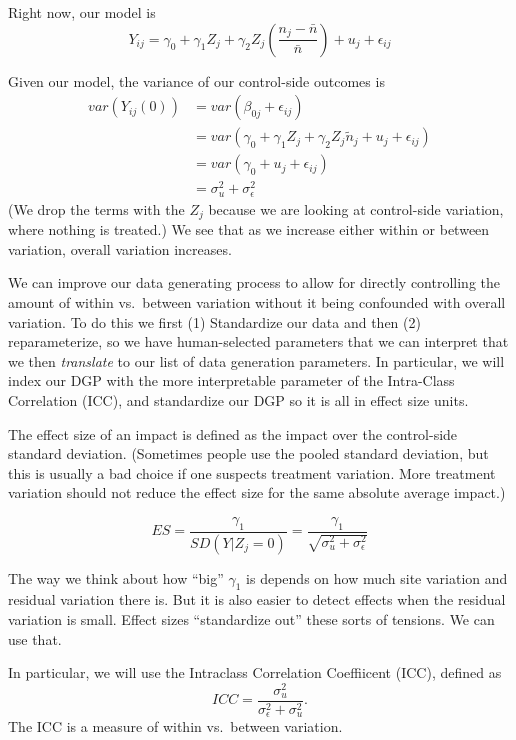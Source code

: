 \documentclass[
]{book}
\begin{document}
Right now, our model is
\[ Y_{ij} = \gamma_{0} + \gamma_{1} Z_j + \gamma_2 Z_j \left(\frac{n_j - \bar{n}}{\bar{n}} \right)  + u_j + \epsilon_{ij}  \]

Given our model, the variance of our control-side outcomes is
\[ 
\begin{aligned}
var( Y_{ij}(0) ) &= var( \beta_{0j} + \epsilon_{ij} ) \\
&= var( \gamma_{0} + \gamma_{1} Z_j + \gamma_{2}Z_j \tilde{n}_j + u_j + \epsilon_{ij} ) \\
&= var( \gamma_{0} + u_j + \epsilon_{ij} ) \\
&= \sigma^2_u + \sigma^2_\epsilon
\end{aligned}
\]
(We drop the terms with the \(Z_j\) because we are looking at control-side variation, where nothing is treated.)
We see that as we increase either within or between variation, overall variation increases.

We can improve our data generating process to allow for directly controlling the amount of within vs.~between variation without it being confounded with overall variation.
To do this we first (1) Standardize our data and then (2) reparameterize, so we have human-selected parameters that we can interpret that we then \emph{translate} to our list of data generation parameters.
In particular, we will index our DGP with the more interpretable parameter of the Intra-Class Correlation (ICC), and standardize our DGP so it is all in effect size units.

The effect size of an impact is defined as the impact over the control-side standard deviation.
(Sometimes people use the pooled standard deviation, but this is usually a bad choice if one suspects treatment variation. More treatment variation should not reduce the effect size for the same absolute average impact.)

\[ ES = \frac{\gamma_1}{SD( Y | Z_j = 0 )} = \frac{\gamma_1}{\sqrt{ \sigma^2_u + \sigma^2_\epsilon } } \]

The way we think about how ``big'' \(\gamma_1\) is depends on how much site variation and residual variation there is.
But it is also easier to detect effects when the residual variation is small.
Effect sizes ``standardize out'' these sorts of tensions. We can use that.

In particular, we will use the Intraclass Correlation Coeffiicent (ICC), defined as
\[ ICC = \frac{ \sigma^2_u }{ \sigma^2_\epsilon + \sigma^2_u } . \]
The ICC is a measure of within vs.~between variation.
\end{document}
